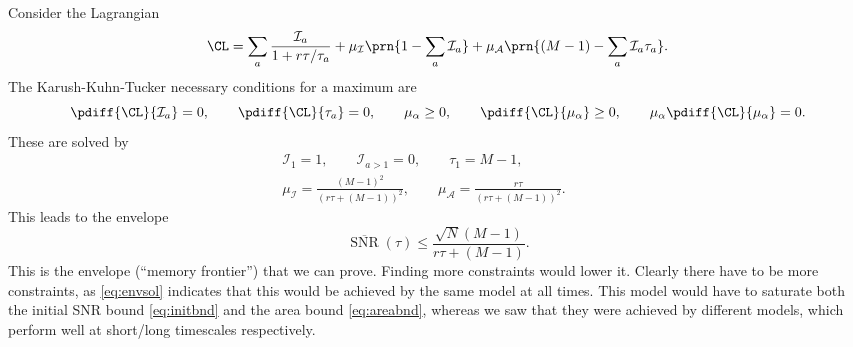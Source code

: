 \documentclass[12pt]{article}
\DeclareMathOperator{\snr}{SNR}
\newcommand{\snrb}{\overline{\snr}}
\newcommand{\CI}{\mathcal{I}}
\newcommand{\CA}{\mathcal{A}}
\begin{document}
Consider the Lagrangian
%
\begin{equation}\label{eq:envlagrangian}
  \CL = \sum_a \frac{\CI_a}{1+r\tau/\tau_a} + \mu_\CI \prn{1 - \sum_a \CI_a} + \mu_\CA \prn{(M-1) - \sum_a \CI_a \tau_a}.
\end{equation}
%
The Karush-Kuhn-Tucker necessary conditions for a maximum are
%
\begin{equation}\label{eq:envKTcond}
  \pdiff{\CL}{\CI_a} = 0, \qquad
  \pdiff{\CL}{\tau_a} = 0, \qquad
  \mu_\alpha \geq 0, \qquad
  \pdiff{\CL}{\mu_\alpha} \geq 0, \qquad
  \mu_\alpha\pdiff{\CL}{\mu_\alpha} = 0. 
\end{equation}
%
These are solved by
%
\begin{equation}\label{eq:envsol}
\begin{gathered}
  \CI_1 = 1, \qquad
  \CI_{a>1} = 0, \qquad
  \tau_1 = M-1, \\
  \mu_\CI = \frac{(M-1)^2}{(r\tau + (M-1))^2}, \qquad
  \mu_\CA = \frac{r\tau}{(r\tau+(M-1))^2}. \qquad
\end{gathered}
\end{equation}
%
This leads to the envelope
%
\begin{equation}\label{eq:env}
  \snrb(\tau) \leq \frac{\sqrt{N}(M-1)}{r\tau + (M-1)}.
\end{equation}
%
This is the envelope (``memory frontier'') that we can prove.
Finding more constraints would lower it.
Clearly there have to be more constraints, as \eqref{eq:envsol} indicates that this would be achieved by the same model at all times.
This model would have to saturate both the initial SNR bound \eqref{eq:initbnd} and the area bound \eqref{eq:areabnd}, whereas we saw that they were achieved by different models, which perform well at short/long timescales respectively.












\end{document}
